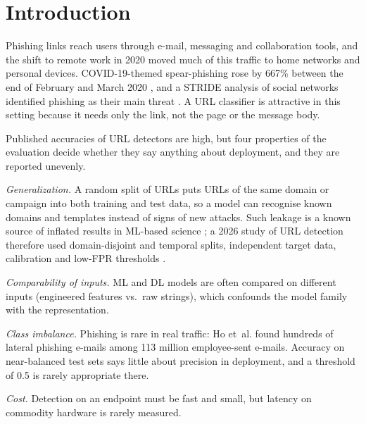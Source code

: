 \documentclass[conference]{IEEEtran}
\begin{document}
\section{Introduction}

Phishing links reach users through e-mail, messaging and collaboration tools, and the shift to remote work in 2020 moved much of this traffic to home networks and personal devices. COVID-19-themed spear-phishing rose by 667\% between the end of February and March 2020 \cite{barracuda2020}, and a STRIDE analysis of social networks identified phishing as their main threat \cite{sharma2023}. A URL classifier is attractive in this setting because it needs only the link, not the page or the message body.

Published accuracies of URL detectors are high, but four properties of the evaluation decide whether they say anything about deployment, and they are reported unevenly.

\emph{Generalization.} A random split of URLs puts URLs of the same domain or campaign into both training and test data, so a model can recognise known domains and templates instead of signs of new attacks. Such leakage is a known source of inflated results in ML-based science \cite{kapoor2023}; a 2026 study of URL detection therefore used domain-disjoint and temporal splits, independent target data, calibration and low-FPR thresholds \cite{glazyrina2026}.

\emph{Comparability of inputs.} ML and DL models are often compared on different inputs (engineered features vs.\ raw strings), which confounds the model family with the representation.

\emph{Class imbalance.} Phishing is rare in real traffic: Ho et~al. \cite{ho2019} found hundreds of lateral phishing e-mails among 113 million employee-sent e-mails. Accuracy on near-balanced test sets says little about precision in deployment, and a threshold of 0.5 is rarely appropriate there.

\emph{Cost.} Detection on an endpoint must be fast and small, but latency on commodity hardware is rarely measured.
\end{document}
